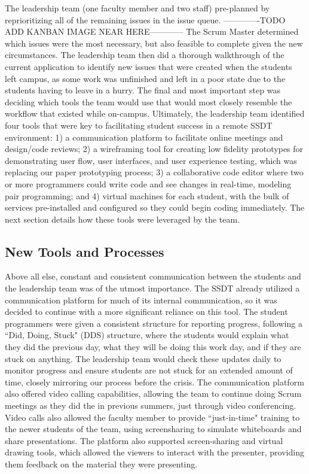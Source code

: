 The leadership team (one faculty member and two staff) pre-planned by reprioritizing all of the remaining issues in the issue queue. -------------TODO ADD KANBAN IMAGE NEAR HERE------------ The Scrum Master determined which issues were the most necessary, but also feasible to complete given the new circumstances. The leadership team then did a thorough walkthrough of the current application to identify new issues that were created when the students left campus, as some work was unfinished and left in a poor state due to the students having to leave in a hurry. The final and most important step was deciding which tools the team would use that would most closely resemble the workflow that existed while on-campus.  Ultimately, the leadership team identified four tools that were key to facilitating student success in a remote SSDT environment: 1) a communication platform to facilitate online meetings and design/code reviews; 2) a wireframing tool for creating low fidelity prototypes for demonstrating user flow, user interfaces, and user experience testing, which was replacing our paper prototyping process; 3) a collaborative code editor where two or more programmers could write code and see changes in real-time, modeling pair programming; and 4) virtual machines for each student, with the bulk of services pre-installed and configured so they could begin coding immediately. The next section details how these tools were leveraged by the team.

\subsection{New Tools and Processes}
Above all else, constant and consistent communication between the students and the leadership team was of the utmost importance. The SSDT already utilized a communication platform for much of its internal communication, so it was decided to continue with a more significant reliance on this tool. The student programmers were given a consistent structure for reporting progress, following a ``Did, Doing, Stuck" (DDS) structure, where the students would explain what they did the previous day, what they will be doing this work day, and if they are stuck on anything. The leadership team would check these updates daily to monitor progress and ensure students are not stuck for an extended amount of time, closely mirroring our process before the crisis. The communication platform also offered video calling capabilities, allowing the team to continue doing Scrum meetings as they did the in previous summers, just through video conferencing. Video calls also allowed the faculty member to provide ``just-in-time" training to the newer students of the team, using screensharing to simulate whiteboards and share presentations. The platform also supported screen-sharing and virtual drawing tools, which allowed the viewers to interact with the presenter, providing them feedback on the material they were presenting.

